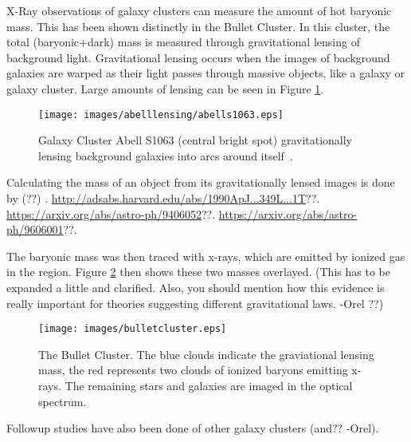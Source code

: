     X-Ray observations of galaxy clusters can measure the amount of hot baryonic mass.
    This has been shown distinctly in the Bullet Cluster\cite{bullet_cluster}.
    In this cluster, the total (baryonic+dark) mass is measured through gravitational lensing of background light.
    Gravitational lensing occurs when the images of background galaxies are warped as their light passes through massive objects, like a galaxy or galaxy cluster.
    Large amounts of lensing can be seen in Figure \ref{fig:abelllensing}.
    
    \begin{figure}[ht]
      \centering
      \texttt{[image: images/abelllensing/abells1063.eps]}
      \caption[Abell S1063 Lensing]{
        Galaxy Cluster Abell S1063 (central bright spot) gravitationally lensing background galaxies into arcs around itself~\cite{abelllensing,clusterimages}.
      }
      \label{fig:abelllensing}
    \end{figure}
    
    Calculating the mass of an object from its gravitationally lensed images is done by {\color{red}(??)} \cite{}.
    {\color{red}\url{http://adsabs.harvard.edu/abs/1990ApJ...349L...1T}??}.
    {\color{red}\url{https://arxiv.org/abs/astro-ph/9406052}??}.
    {\color{red}\url{https://arxiv.org/abs/astro-ph/9606001}??}.
    
    The baryonic mass was then traced with x-rays, which are emitted by ionized gas in the region.
    Figure \ref{fig:bullet} then shows these two masses overlayed.
    {\color{red}(This has to be expanded a little and clarified. Also, you should mention how this evidence is really important for theories suggesting different gravitational laws. -Orel ??)}

    \begin{figure}[ht]
      \centering
      \texttt{[image: images/bulletcluster.eps]}
      \caption[The Bullet Cluster]{
        The Bullet Cluster\cite{bullet_cluster_combined_image}.
        The blue clouds indicate the graviational lensing mass\cite{bullet_cluster}, the red represents two clouds of ionized baryons emitting x-rays\cite{bullet_cluster_chandramap}.
        The remaining stars and galaxies are imaged in the optical spectrum\cite{bullet_cluster_composite}.}
      \label{fig:bullet}
    \end{figure}

    Followup studies have also been done of other galaxy clusters {\color{red}(and?? -Orel)}.

